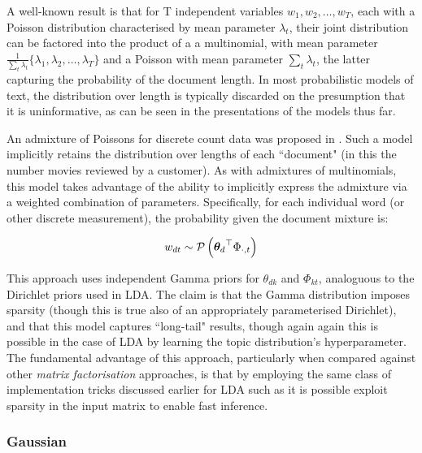 A well-known result\cite{Bishop2006}\cite{Inouye2014} is that for T independent variables $w_1, w_2, \ldots, w_T$, each with a Poisson distribution characterised by mean parameter $\lambda_t$, their joint distribution can be factored into the product of a a multinomial, with mean parameter $\frac{1}{\sum_t \lambda_t} \{\lambda_1, \lambda_2, \ldots, \lambda_T\}$ and a Poisson with mean parameter $\sum_t \lambda_t$, the latter capturing the probability of the document length. In most probabilistic models of text, the distribution over length is typically discarded on the presumption that it is uninformative, as can be seen in the presentations of the models thus far.

An admixture of Poissons for discrete count data was proposed in \cite{Gopalan2013}. Such a model implicitly retains the distribution over lengths of each ``document" (in this the number movies reviewed by a customer). As with admixtures of multinomials, this model takes advantage of the ability to implicitly express the admixture via a weighted combination of parameters. Specifically, for each individual word (or other discrete measurement), the probability given the document mixture is:


\begin{align}
w_{dt} \sim \mathcal{P} \left( {{ \bm \theta_d }^\top\Phi_{\cdot,t}} \right)
\end{align}

This approach uses independent Gamma priors for $\theta_{dk}$ and $\Phi_{kt}$, analoguous to the Dirichlet priors used in LDA. The claim is that the Gamma distribution imposes sparsity (though this is true also of an appropriately parameterised Dirichlet), and that this model captures ``long-tail" results, though again again this is possible in the case of LDA by learning the topic distribution's hyperparameter\cite{Wallach2009a}. The fundamental advantage of this approach, particularly when compared against other \emph{matrix factorisation} approaches, is that by employing the same class of implementation tricks discussed earlier for LDA such as \cite{Mimno2012a} it is possible exploit sparsity in the input matrix to enable fast inference.

\subsubsection*{Gaussian}

